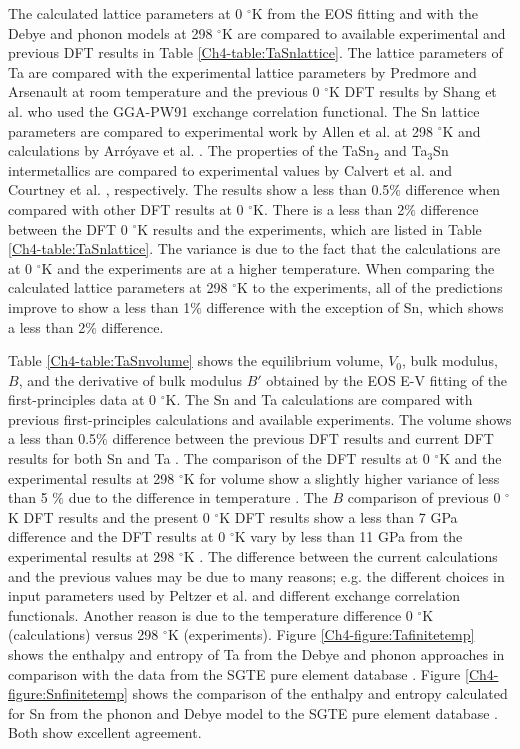 The calculated lattice parameters at 0 $^\circ$K from the EOS fitting and with the Debye and phonon models at 298 $^\circ$K are compared to available experimental and previous DFT results in Table \ref{Ch4-table:TaSnlattice}. The lattice parameters of Ta are compared with the experimental lattice parameters by Predmore and Arsenault \cite{Predmore1970} at room temperature and the previous 0 $^\circ$K DFT results by Shang et al. \cite{Shang2010b} who used the GGA-PW91 exchange correlation functional. The Sn lattice parameters are compared to experimental work by Allen et al. \cite{Allen1991} at 298 $^\circ$K and calculations by Arr\'oyave et al. \cite{Arroyave2006a}. The properties of the TaSn$_2$ and Ta$_3$Sn intermetallics are compared to experimental values by Calvert et al. \cite{Calvert1991} and Courtney et al. \cite{Courtney1965}, respectively. The results show a less than 0.5$\%$ difference when compared with other DFT results at 0 $^\circ$K. There is a less than 2$\%$ difference between the DFT 0 $^\circ$K results and the experiments, which are listed in Table \ref{Ch4-table:TaSnlattice}. The variance is due to the fact that the calculations are at 0 $^\circ$K and the experiments are at a higher temperature. When comparing the calculated lattice parameters at 298 $^\circ$K to the experiments, all of the predictions improve to show a less than 1$\%$ difference with the exception of Sn, which shows a less than 2$\%$ difference. 

Table \ref{Ch4-table:TaSnvolume} shows the equilibrium volume, $V_{0}$, bulk modulus, $B$, and the derivative of bulk modulus $B'$ obtained by the EOS E-V fitting of the first-principles data at 0 $^\circ$K.  The Sn and Ta calculations are compared with previous first-principles calculations and available experiments. The volume shows a less than 0.5$\%$ difference between the previous DFT results and current DFT results for both Sn and Ta \cite{Predmore1970,PeltzeryBlanca1993a}. The comparison of the DFT results at 0 $^\circ$K and the experimental results at 298 $^{\circ}$K for volume show a slightly higher variance of less than 5 $\%$ due to the difference in temperature \cite{Shang2010b,PeltzeryBlanca1993a}. The $B$ comparison of previous 0 $^\circ$K DFT results and the present 0 $^\circ$K DFT results show a less than 7 GPa difference and the DFT results at 0 $^\circ$K vary by less than 11 GPa from the experimental results at 298 $^\circ$K \cite{Predmore1970,Shang2010b,PeltzeryBlanca1993a}. The difference between the current calculations and the previous values may be due to many reasons; e.g. the different choices in input parameters used by Peltzer et al. \cite{PeltzeryBlanca1993a} and different exchange correlation functionals. Another reason is due to the temperature difference 0 $^\circ$K (calculations) versus 298 $^\circ$K (experiments). Figure \ref{Ch4-figure:Tafinitetemp} shows the enthalpy and entropy of Ta from the Debye and phonon approaches in comparison with the data from the SGTE pure element database \cite{Dinsdale1991}. Figure \ref{Ch4-figure:Snfinitetemp} shows the comparison of the enthalpy and entropy calculated for Sn from the phonon and Debye model to the SGTE pure element database \cite{Dinsdale1991}. Both show excellent agreement.

